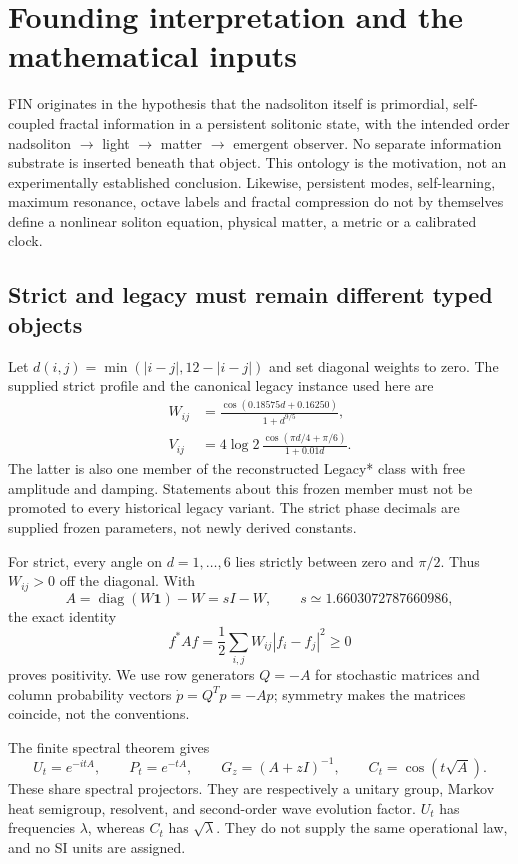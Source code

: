 \documentclass[11pt,a4paper]{article}
\newcommand{\one}{\mathbf 1}
\newcommand{\diag}{\operatorname{diag}}
\begin{document}
\section{Founding interpretation and the mathematical inputs}

FIN originates in the hypothesis that the nadsoliton itself is primordial,
self-coupled fractal information in a persistent solitonic state, with the
intended order nadsoliton $\to$ light $\to$ matter $\to$ emergent observer.
No separate information substrate is inserted beneath that object. This
ontology is the motivation, not an experimentally established conclusion.
Likewise, persistent modes, self-learning, maximum resonance, octave labels
and fractal compression do not by themselves define a nonlinear soliton
equation, physical matter, a metric or a calibrated clock.

\subsection{Strict and legacy must remain different typed objects}

Let $d(i,j)=\min(|i-j|,12-|i-j|)$ and set diagonal weights to zero. The
supplied strict profile and the canonical legacy instance used here are
\begin{align}
 W_{ij}&=\frac{\cos(0.18575d+0.16250)}{1+d^{9/5}},\\
 V_{ij}&=4\log2\,\frac{\cos(\pi d/4+\pi/6)}{1+0.01d}.
\end{align}
The latter is also one member of the reconstructed Legacy* class with free
amplitude and damping. Statements about this frozen member must not be
promoted to every historical legacy variant. The strict phase decimals are
supplied frozen parameters, not newly derived constants.

For strict, every angle on $d=1,\ldots,6$ lies strictly between zero and
$\pi/2$. Thus $W_{ij}>0$ off the diagonal. With
\[
 A=\diag(W\one)-W=sI-W,\qquad
 s\simeq1.6603072787660986,
\]
the exact identity
\[
 f^*Af=\frac12\sum_{i,j}W_{ij}|f_i-f_j|^2\geq0
\]
proves positivity. We use row generators $Q=-A$ for stochastic matrices and
column probability vectors $\dot p=Q^Tp=-Ap$; symmetry makes the matrices
coincide, not the conventions.

The finite spectral theorem gives
\[
 U_t=e^{-itA},\qquad P_t=e^{-tA},\qquad
 G_z=(A+zI)^{-1},\qquad C_t=\cos(t\sqrt A).
\]
These share spectral projectors. They are respectively a unitary group,
Markov heat semigroup, resolvent, and second-order wave evolution factor.
$U_t$ has frequencies $\lambda$, whereas $C_t$ has $\sqrt\lambda$.
They do not supply the same operational law, and no SI units are assigned.
\end{document}
